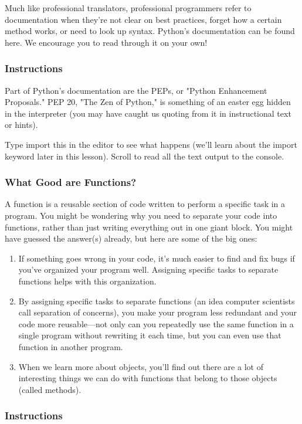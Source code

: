 \documentclass[12pt,a4paper,final,twoside,onecolumn,titlepage]{book}
\begin{document}
Much like professional translators, professional programmers refer to documentation when they're not clear on best practices, forget how a certain method works, or need to look up syntax. Python's documentation can be found here. We encourage you to read through it on your own!
\subsubsection{Instructions}

Part of Python's documentation are the PEPs, or "Python Enhancement Proposals." PEP 20, "The Zen of Python," is something of an easter egg hidden in the interpreter (you may have caught us quoting from it in instructional text or hints).

Type import this in the editor to see what happens (we'll learn about the import keyword later in this lesson). Scroll to read all the text output to the console.

\subsubsection{What Good are Functions?}

A function is a reusable section of code written to perform a specific task in a program. You might be wondering why you need to separate your code into functions, rather than just writing everything out in one giant block. You might have guessed the answer(s) already, but here are some of the big ones:
\begin{enumerate}
\item    If something goes wrong in your code, it's much easier to find and fix bugs if you've organized your program well. Assigning specific tasks to separate functions helps with this organization.

\item    By assigning specific tasks to separate functions (an idea computer scientists call separation of concerns), you make your program less redundant and your code more reusable—not only can you repeatedly use the same function in a single program without rewriting it each time, but you can even use that function in another program.

\item    When we learn more about objects, you'll find out there are a lot of interesting things we can do with functions that belong to those objects (called methods).
\end{enumerate}
\subsubsection{Instructions}
\end{document}
